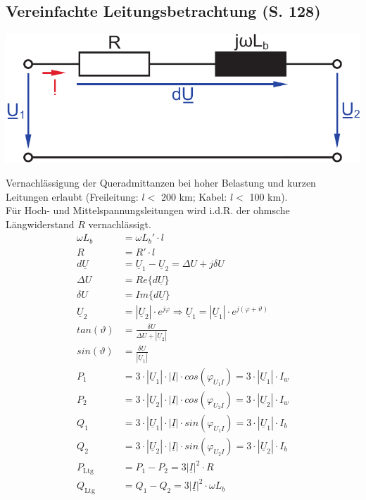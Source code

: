 \documentclass[a4paper,twocolumn,10pt]{article}
\begin{document}
\subsection{Vereinfachte Leitungsbetrachtung (S. 128)}
\begin{center}
\includegraphics[width=0.8\columnwidth]{Grafiken/Uebertragungsleitung}
\end{center}
Vernachlässigung der Queradmittanzen bei hoher Belastung und kurzen Leitungen erlaubt (Freileitung: $l<$ 200 km; Kabel: $l<$ 100 km).\\
Für Hoch- und Mittelspannungsleitungen wird i.d.R. der ohmsche Längwiderstand $R$ vernachlässigt.
\begin{equation*}
\begin{split}
\omega L_b&=\omega L_b'\cdot l\\
R&=R'\cdot l\\
d\underline{U}&=\underline{U}_1-\underline{U}_2=\Delta U+j\delta U\\
\Delta U&=Re\{d\underline{U}\}\\
\delta U&=Im\{d\underline{U}\}\\
\underline{U}_2&=|\underline{U}_2|\cdot e^{j\varphi}\Rightarrow \underline{U}_1=|\underline{U}_1|\cdot e^{j(\varphi+\vartheta)}\\
tan(\vartheta)&=\frac{\delta U}{\Delta U+|\underline{U}_2|}\\
sin(\vartheta)&=\frac{\delta U}{|\underline{U}_1|}\\
P_1&=3\cdot|\underline{U}_1|\cdot |\underline{I}|\cdot cos(\varphi_{U_1I})=3\cdot |\underline{U}_1|\cdot I_w\\
P_2&=3\cdot|\underline{U}_2|\cdot |\underline{I}|\cdot cos(\varphi_{U_2I})=3\cdot |\underline{U}_2|\cdot I_w\\
Q_1&=3\cdot|\underline{U}_1|\cdot |\underline{I}|\cdot sin(\varphi_{U_1I})=3\cdot |\underline{U}_1|\cdot I_b\\
Q_2&=3\cdot|\underline{U}_2|\cdot |\underline{I}|\cdot sin(\varphi_{U_2I})=3\cdot |\underline{U}_2|\cdot I_b\\
P_{\text{Ltg}}&=P_1-P_2=3|\underline{I}|^2\cdot R\\
Q_{\text{Ltg}}&=Q_1-Q_2=3|\underline{I}|^2\cdot \omega L_b
\end{split}
\end{equation*}
\end{document}
